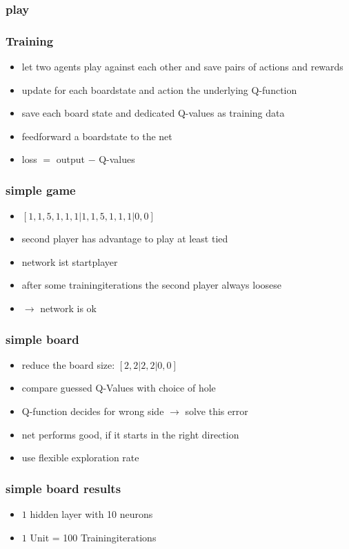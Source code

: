 \documentclass{beamer}
\begin{document}
 \begin{frame}
 \frametitle{play}
 
 \end{frame}
 
 
 \begin{frame}
 \frametitle{Training}
 \begin{itemize}
\item let two agents play against each other and save pairs of actions and rewards
\item update for each boardstate and action the underlying Q-function
\item save each board state and dedicated Q-values as training data
\item feedforward a boardstate to the net
\item loss $=$ output $-$ Q-values
\end{itemize}
 \end{frame}
 
 \begin{frame}
 \frametitle{simple game}
\begin{itemize}
\item $[1,1,5,1,1,1|1,1,5,1,1,1|0,0]$
\item second player has advantage to play at least tied
\item network ist startplayer
\item after some trainingiterations the second player always loosese
\item $\rightarrow$ network is ok
\end{itemize}
 \end{frame}

 \begin{frame}
 \frametitle{simple board}
 \begin{itemize}
\item reduce the board size: $[2,2|2,2|0,0]$
\item compare guessed Q-Values with choice of hole
\item Q-function decides for wrong side $\rightarrow$ solve this error
\item net performs good, if it starts in the right direction
\item use flexible exploration rate
\end{itemize}
 \end{frame}

 \begin{frame}
 \frametitle{simple board results}
\begin{itemize}
\item $1$ hidden layer with 10 neurons
\item $1$ Unit = 100 Trainingiterations
\end{itemize}
 \end{frame}
\end{document}
